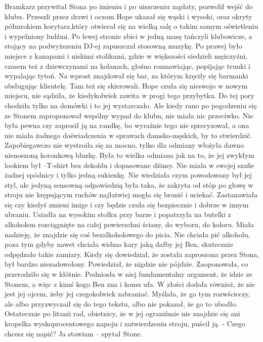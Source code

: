 \documentclass[12pt,a4paper]{book}
\begin{document}
Bramkarz przywitał Stona po imieniu i po uiszczeniu zapłaty, pozwolił wejść do klubu. Przeszli przez drzwi i oczom Hope ukazał się wąski i wysoki, oraz okryty półmrokiem korytarz,który otwierał się na wielką salę o takim samym oświetleniu i wypełniony ludźmi. Po lewej stronie zbici w jedną masę tańczyli klubowicze, a stojący na podwyższeniu DJ-ej zapuszczał stosowną muzykę. Po prawej było miejsce z kanapami i niskimi stolikami, gdzie w większości siedzieli mężczyźni, czasem też z dziewczynami na kolanach, głośno rozmawiając, popijając trunki i wypalając tytoń. Na wprost znajdował się bar, za którym kręciły się barmanki obsługując klientelę. Tam też się skierowali. 
Hope czuła się nieswojo w nowym miejscu, nie sądziła, że kiedykolwiek zawita w progi tego przybytku. Do tej pory chodziła tylko na domówki i to jej wystarczało. Ale kiedy rano po pogodzeniu się ze Stonem zaproponował wspólny wypad do klubu, nie miała nic przeciwko. Nie była pewna czy zaprosił ją na randkę, bo wyraźnie tego nie sprecyzował, a ona nie miała żadnego doświadczenia w sprawach damsko-męskich, by to stwierdzić. Zapobiegawczo nie wystroiła się za mocno, tylko dla odmiany włożyła dawno nienoszoną koronkową bluzkę. Była to wielka odmiana jak na to, że jej zwykłym lookiem był –T-shirt bez dekoldu i dopasowane dżinsy. Nie miała w swojej szafie żadnej spódnicy i tylko jedną sukienkę. Nie wiedziała czym powodowany był jej styl, ale jedyną sensowną odpowiedzią była taka, że zakryta od stóp po głowę w stroju nie krępującym ruchów najłatwiej mogła się bronić i uciekać. Zastanawiała się czy kiedyś zmieni imige i czy będzie czuła się bezpiecznie i dobrze w innym ubraniu. 
Usiadła na wysokim stołku przy barze i popatrzyła na butelki z alkoholem rozciągnięte na całej powierzchni ściany, do wyboru, do koloru. Miała nadzieję, że znajdzie się coś bezalkoholowego do picia. Nie chciała pić alkoholu, poza tym gdyby nawet chciała widmo kary jaką dałby jej Ben, skutecznie odpędzało takie zamiary. Kiedy się dowiedział, że została zaproszona przez Stona, był bardzo niezadowolony. Powiedział, że nigdzie nie pójdzie. Zaoponowała, co przerodziło się w kłótnie. Podniosła w niej fundamentalny argument, że idzie ze Stonem, a więc z kimś kogo Ben zna i komu ufa. W złości dodała również, że nie jest jej ojcem, żeby jej czegokolwiek zabraniać. Myślała, że go tym rozwścieczy, ale albo przyzwyczaił się do tego tekstu, albo nie pokazał, że go to ubodło. Ostatecznie po litanii rad, obietnicy, że w jej ograniźmie nie znajdzie się ani kropelka wyskoprocentowego napoju i zatwierdzeniu stroju, puścił ją. 
- Czego chcesz się napić? Ja stawiam – spytał Stone. 
\end{document}
